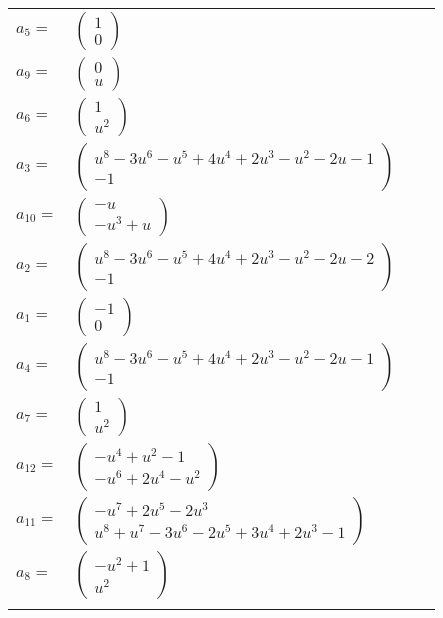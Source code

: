 \documentclass[1p]{elsarticle_modified}
\theoremstyle{definition}
\begin{document}
\begin{tabular}{m{7pt} m{180pt} m{7pt} m{180pt} }
\flushright $a_{5}=$&$\begin{pmatrix}1\\0\end{pmatrix}$ \\
\flushright $a_{9}=$&$\begin{pmatrix}0\\u\end{pmatrix}$ \\
\flushright $a_{6}=$&$\begin{pmatrix}1\\u^2\end{pmatrix}$ \\
\flushright $a_{3}=$&$\begin{pmatrix}u^8-3 u^6- u^5+4 u^4+2 u^3- u^2-2 u-1\\-1\end{pmatrix}$ \\
\flushright $a_{10}=$&$\begin{pmatrix}- u\\- u^3+u\end{pmatrix}$ \\
\flushright $a_{2}=$&$\begin{pmatrix}u^8-3 u^6- u^5+4 u^4+2 u^3- u^2-2 u-2\\-1\end{pmatrix}$ \\
\flushright $a_{1}=$&$\begin{pmatrix}-1\\0\end{pmatrix}$ \\
\flushright $a_{4}=$&$\begin{pmatrix}u^8-3 u^6- u^5+4 u^4+2 u^3- u^2-2 u-1\\-1\end{pmatrix}$ \\
\flushright $a_{7}=$&$\begin{pmatrix}1\\u^2\end{pmatrix}$ \\
\flushright $a_{12}=$&$\begin{pmatrix}- u^4+u^2-1\\- u^6+2 u^4- u^2\end{pmatrix}$ \\
\flushright $a_{11}=$&$\begin{pmatrix}- u^7+2 u^5-2 u^3\\u^8+u^7-3 u^6-2 u^5+3 u^4+2 u^3-1\end{pmatrix}$ \\
\flushright $a_{8}=$&$\begin{pmatrix}- u^2+1\\u^2\end{pmatrix}$\\&\end{tabular}
\end{document}
